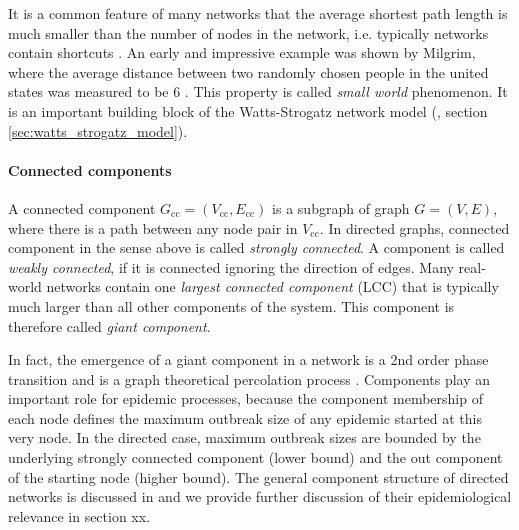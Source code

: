 It is a common feature of many networks that the average shortest path length is much smaller than the number of nodes in the network, i.e. typically networks contain shortcuts \citep{RevModPhys.74}.
An early and impressive example was shown by Milgrim, where the average distance between two randomly chosen people in the united states was measured to be 6 \citep{Milgram:1967}. 
This property is called \emph{small world} phenomenon.
It is an important building block of the Watts-Strogatz network model (\citep{Watts:1998}, section \ref{sec:watts_strogatz_model}).



\paragraph{Connected components\color{Cayenne}{.}}
A connected component $G_\mathrm{cc}=(V_\mathrm{cc},E_\mathrm{cc})$ is a subgraph of graph $G=(V,E)$, where there is a path between any node pair in $V_\mathrm{cc}$.
In directed graphs, connected component in the sense above is called \emph{strongly connected}.
A component is called \emph{weakly connected}, if it is connected ignoring the direction of edges.
Many real-world networks contain one \emph{largest connected component} (LCC) that is typically much larger than all other components of the system.
This component is therefore called \emph{giant component}.

In fact, the emergence of a giant component in a network is a 2nd order phase transition and is a graph theoretical percolation process \citep{Newman2003}. 
Components play an important role for epidemic processes, because the component membership of each node defines the maximum outbreak size of any epidemic started at this very node.
In the directed case, maximum outbreak sizes are bounded by the underlying strongly connected component (lower bound) and the out component of the starting node (higher bound).
The general component structure of directed networks is discussed in \citep{Dorogovtsev:2001jd} and we provide further discussion of their epidemiological relevance in section xx.


